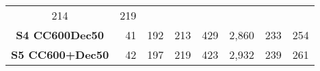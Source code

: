 \begin{longtable}[]{@{}crrrrrrr@{}}
\begin{minipage}[t]{0.07\columnwidth}
214\strut
\end{minipage} & \begin{minipage}[t]{0.14\columnwidth}\raggedleft\strut
219\strut
\end{minipage}\tabularnewline
\begin{minipage}[t]{0.12\columnwidth}\centering\strut
\textbf{S4 CC600Dec50}\strut
\end{minipage} & \begin{minipage}[t]{0.10\columnwidth}\raggedleft\strut
41\strut
\end{minipage} & \begin{minipage}[t]{0.06\columnwidth}\raggedleft\strut
192\strut
\end{minipage} & \begin{minipage}[t]{0.13\columnwidth}\raggedleft\strut
213\strut
\end{minipage} & \begin{minipage}[t]{0.07\columnwidth}\raggedleft\strut
429\strut
\end{minipage} & \begin{minipage}[t]{0.09\columnwidth}\raggedleft\strut
2,860\strut
\end{minipage} & \begin{minipage}[t]{0.07\columnwidth}\raggedleft\strut
233\strut
\end{minipage} & \begin{minipage}[t]{0.14\columnwidth}\raggedleft\strut
254\strut
\end{minipage}\tabularnewline
\begin{minipage}[t]{0.12\columnwidth}\centering\strut
\textbf{S5 CC600+Dec50}\strut
\end{minipage} & \begin{minipage}[t]{0.10\columnwidth}\raggedleft\strut
42\strut
\end{minipage} & \begin{minipage}[t]{0.06\columnwidth}\raggedleft\strut
197\strut
\end{minipage} & \begin{minipage}[t]{0.13\columnwidth}\raggedleft\strut
219\strut
\end{minipage} & \begin{minipage}[t]{0.07\columnwidth}\raggedleft\strut
423\strut
\end{minipage} & \begin{minipage}[t]{0.09\columnwidth}\raggedleft\strut
2,932\strut
\end{minipage} & \begin{minipage}[t]{0.07\columnwidth}\raggedleft\strut
239\strut
\end{minipage} & \begin{minipage}[t]{0.14\columnwidth}\raggedleft\strut
261\strut
\end{minipage}\tabularnewline
\bottomrule
\end{longtable}